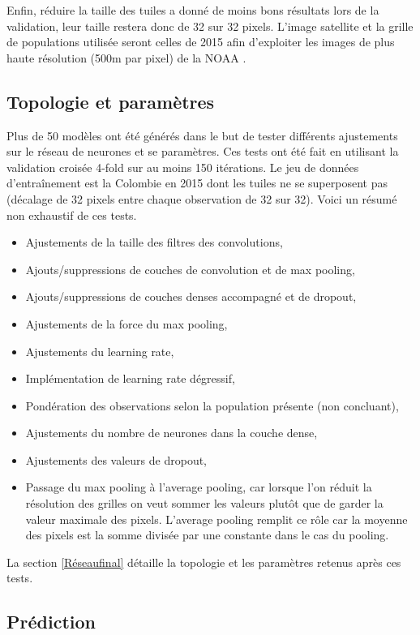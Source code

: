 \documentclass[a4paper, 11pt]{report}
\begin{document}
Enfin, réduire la taille des tuiles a donné de moins bons résultats lors de la validation, leur taille restera donc de 32 sur 32 pixels. L'image satellite et la grille de populations utilisée \cite{sedac} seront celles de 2015 afin d'exploiter les images de plus haute résolution (500m par pixel) de la NOAA \cite{noaa-viirs}.

\subsection{Topologie et paramètres}
Plus de 50 modèles ont été générés dans le but de tester différents ajustements sur le réseau de neurones et se paramètres. Ces tests ont été fait en utilisant la validation croisée 4-fold sur au moins 150 itérations. Le jeu de données d'entraînement est la Colombie en 2015 dont les tuiles ne se superposent pas (décalage de 32 pixels entre chaque observation de 32 sur 32). Voici un résumé non exhaustif de ces tests.

\begin{itemize}
	\item Ajustements de la taille des filtres des convolutions,
	\item Ajouts/suppressions de couches de convolution et de max pooling,
	\item Ajouts/suppressions de couches denses accompagné et de dropout,
	\item Ajustements de la force du max pooling,
	\item Ajustements du learning rate,
	\item Implémentation de learning rate dégressif,
	\item Pondération des observations selon la population présente (non concluant),
	\item Ajustements du nombre de neurones dans la couche dense,
	\item Ajustements des valeurs de dropout,
	\item Passage du max pooling à l'average pooling, car lorsque l'on réduit la résolution des grilles on veut sommer les valeurs plutôt que de garder la valeur maximale des pixels. L'average pooling remplit ce rôle car la moyenne des pixels est la somme divisée par une constante dans le cas du pooling.
\end{itemize}

La section \ref{Réseaufinal} détaille la topologie et les paramètres retenus après ces tests.

\subsection{Prédiction}
\end{document}
